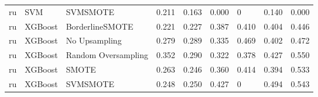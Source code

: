 \begin{tabular}{lllllllll}
      ru &                          SVM &            SVMSMOTE & 0.211 &                     0.163 &                 0.000 &                      0 &                                   0.140 &     0.000 \\
      ru &                      XGBoost &     BorderlineSMOTE & 0.221 &                     0.227 &                 0.387 &                  0.410 &                                   0.404 &     0.446 \\
      ru &                      XGBoost &       No Upsampling & 0.279 &                     0.289 &                 0.335 &                  0.469 &                                   0.402 &     0.472 \\
      ru &                      XGBoost & Random Oversampling & 0.352 &                     0.290 &                 0.322 &                  0.378 &                                   0.427 &     0.550 \\
      ru &                      XGBoost &               SMOTE & 0.263 &                     0.246 &                 0.360 &                  0.414 &                                   0.394 &     0.533 \\
      ru &                      XGBoost &            SVMSMOTE & 0.248 &                     0.250 &                 0.427 &                      0 &                                   0.494 &     0.543 \\
\bottomrule
\end{tabular}
